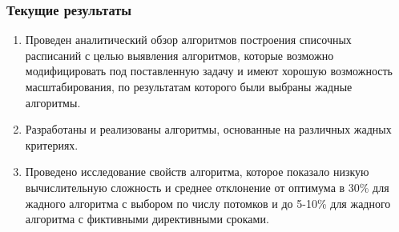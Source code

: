 \begin{frame}
    \frametitle{Текущие результаты}
    \begin{enumerate}
        \item Проведен аналитический обзор алгоритмов построения списочных расписаний с целью выявления алгоритмов, которые возможно модифицировать под поставленную задачу и имеют хорошую возможность масштабирования, по результатам которого были выбраны жадные алгоритмы.
        \item Разработаны и реализованы алгоритмы, основанные на различных жадных критериях.
        \item Проведено исследование свойств алгоритма, которое показало низкую вычислительную сложность и среднее отклонение от оптимума в 30\% для жадного алгоритма с выбором по числу потомков и до 5-10\% для жадного алгоритма с фиктивными директивными сроками. 
    \end{enumerate}
\end{frame}